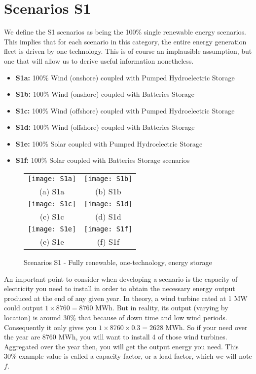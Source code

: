 \section{Scenarios S1}

We define the S1 scenarios as being the 100\% single renewable energy scenarios. This implies that for each scenario in this category, the entire energy generation fleet is driven by one technology. This is of course an implausible assumption, but one that will allow us to derive useful information nonetheless.

\begin{kaobox}[frametitle=S1 scenarios]
\begin{itemize}
	\item \textbf{S1a:} 100\% Wind (onshore) coupled with Pumped Hydroelectric Storage
	\item \textbf{S1b:} 100\% Wind (onshore) coupled with Batteries Storage
	\item \textbf{S1c:} 100\% Wind (offshore) coupled with Pumped Hydroelectric Storage
	\item \textbf{S1d:} 100\% Wind (offshore) coupled with Batteries Storage
	\item \textbf{S1e:} 100\% Solar coupled with Pumped Hydroelectric Storage
	\item \textbf{S1f:} 100\% Solar coupled with Batteries Storage scenarios
\end{itemize}
\end{kaobox}


\begin{figure*}
\begin{tabular}{cc}
  \texttt{[image: S1a]} &   \texttt{[image: S1b]} \\
(a) S1a & (b) S1b \\[6pt]
 \texttt{[image: S1c]} &   \texttt{[image: S1d]} \\
(c) S1c & (d) S1d \\[6pt]
 \texttt{[image: S1e]} &   \texttt{[image: S1f]} \\
(e) S1e & (f) S1f \\[6pt]
\end{tabular}
\caption{Scenarios S1 - Fully renewable, one-technology, energy storage}
\end{figure*}

An important point to consider when developing a scenario is the capacity of electricity you need to install in order to obtain the necessary energy output produced at the end of any given year. In theory, a wind turbine rated at 1 MW could output $1 \times 8760 = 8760$ MWh. But in reality, its output (varying by location) is around 30\% that because of down time and low wind periods. Consequently it only gives you $1 \times 8760 \times 0.3 = 2628$ MWh. So if your need over the year are 8760 MWh, you will want to install 4 of those wind turbines. Aggregated over the year then, you will get the output energy you need. This 30\% example value is called a capacity factor, or a load factor, which we will note $f$.

